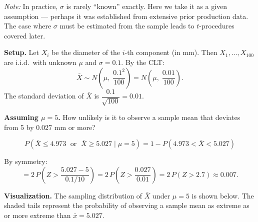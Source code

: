 \documentclass[10pt]{report}
\begin{document}
\textit{Note:} In practice, $\sigma$ is rarely ``known'' exactly. Here we take it as a given assumption --- perhaps it was established from extensive prior production data. The case where $\sigma$ must be estimated from the sample leads to $t$-procedures covered later.

\textbf{Setup.} Let $X_i$ be the diameter of the $i$-th component (in mm). Then $X_1, \ldots, X_{100}$ are i.i.d.\ with unknown $\mu$ and $\sigma = 0.1$. By the CLT:
\[
\bar{X} \sim N\!\left(\mu, \;\frac{0.1^2}{100}\right) = N\!\left(\mu,\; \frac{0.01}{100}\right).
\]
The standard deviation of $\bar{X}$ is $\dfrac{0.1}{\sqrt{100}} = 0.01$.

\textbf{Assuming $\mu = 5$.} How unlikely is it to observe a sample mean that deviates from 5 by 0.027 mm or more?

\[
P\!\left(\bar{X} \leq 4.973 \;\text{ or }\; \bar{X} \geq 5.027 \;\Big|\; \mu = 5\right) = 1 - P(4.973 < \bar{X} < 5.027)
\]

By symmetry:
\[
= 2\,P\!\left(Z > \frac{5.027 - 5}{0.1/10}\right) = 2\,P\!\left(Z > \frac{0.027}{0.01}\right) = 2\,P(Z > 2.7) \approx \boxed{0.007.}
\]

\textbf{Visualization.} The sampling distribution of $\bar{X}$ under $\mu = 5$ is shown below. The shaded tails represent the probability of observing a sample mean as extreme as or more extreme than $\bar{x} = 5.027$.

\begin{center}
\end{center}
\end{document}
